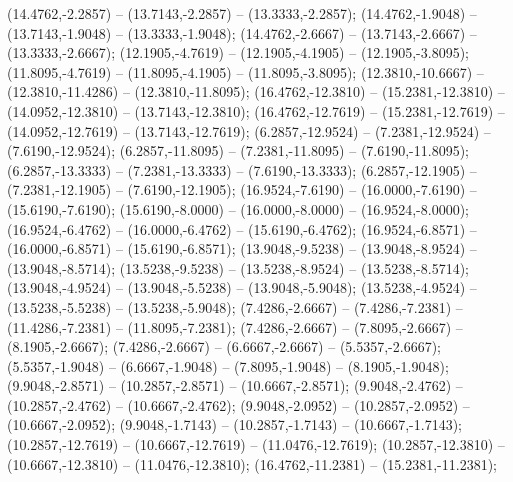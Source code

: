    (14.4762,-2.2857) -- (13.7143,-2.2857) -- (13.3333,-2.2857);
   (14.4762,-1.9048) -- (13.7143,-1.9048) -- (13.3333,-1.9048);
   (14.4762,-2.6667) -- (13.7143,-2.6667) -- (13.3333,-2.6667);
   (12.1905,-4.7619) -- (12.1905,-4.1905) -- (12.1905,-3.8095);
   (11.8095,-4.7619) -- (11.8095,-4.1905) -- (11.8095,-3.8095);
   (12.3810,-10.6667) -- (12.3810,-11.4286) -- (12.3810,-11.8095);
   (16.4762,-12.3810) -- (15.2381,-12.3810) -- (14.0952,-12.3810) -- (13.7143,-12.3810);
   (16.4762,-12.7619) -- (15.2381,-12.7619) -- (14.0952,-12.7619) -- (13.7143,-12.7619);
   (6.2857,-12.9524) -- (7.2381,-12.9524) -- (7.6190,-12.9524);
   (6.2857,-11.8095) -- (7.2381,-11.8095) -- (7.6190,-11.8095);
   (6.2857,-13.3333) -- (7.2381,-13.3333) -- (7.6190,-13.3333);
   (6.2857,-12.1905) -- (7.2381,-12.1905) -- (7.6190,-12.1905);
   (16.9524,-7.6190) -- (16.0000,-7.6190) -- (15.6190,-7.6190);
   (15.6190,-8.0000) -- (16.0000,-8.0000) -- (16.9524,-8.0000);
   (16.9524,-6.4762) -- (16.0000,-6.4762) -- (15.6190,-6.4762);
   (16.9524,-6.8571) -- (16.0000,-6.8571) -- (15.6190,-6.8571);
   (13.9048,-9.5238) -- (13.9048,-8.9524) -- (13.9048,-8.5714);
   (13.5238,-9.5238) -- (13.5238,-8.9524) -- (13.5238,-8.5714);
   (13.9048,-4.9524) -- (13.9048,-5.5238) -- (13.9048,-5.9048);
   (13.5238,-4.9524) -- (13.5238,-5.5238) -- (13.5238,-5.9048);
   (7.4286,-2.6667) -- (7.4286,-7.2381) -- (11.4286,-7.2381) -- (11.8095,-7.2381);
   (7.4286,-2.6667) -- (7.8095,-2.6667) -- (8.1905,-2.6667);
   (7.4286,-2.6667) -- (6.6667,-2.6667) -- (5.5357,-2.6667);
   (5.5357,-1.9048) -- (6.6667,-1.9048) -- (7.8095,-1.9048) -- (8.1905,-1.9048);
   (9.9048,-2.8571) -- (10.2857,-2.8571) -- (10.6667,-2.8571);
   (9.9048,-2.4762) -- (10.2857,-2.4762) -- (10.6667,-2.4762);
   (9.9048,-2.0952) -- (10.2857,-2.0952) -- (10.6667,-2.0952);
   (9.9048,-1.7143) -- (10.2857,-1.7143) -- (10.6667,-1.7143);
   (10.2857,-12.7619) -- (10.6667,-12.7619) -- (11.0476,-12.7619);
   (10.2857,-12.3810) -- (10.6667,-12.3810) -- (11.0476,-12.3810);
   (16.4762,-11.2381) -- (15.2381,-11.2381);
